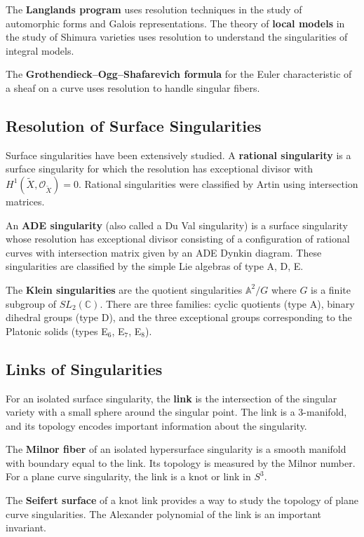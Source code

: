 The \textbf{Langlands program} uses resolution techniques in the study of automorphic forms and Galois representations. The theory of \textbf{local models} in the study of Shimura varieties uses resolution to understand the singularities of integral models.

The \textbf{Grothendieck--Ogg--Shafarevich formula} for the Euler characteristic of a sheaf on a curve uses resolution to handle singular fibers.


\subsection*{Resolution of Surface Singularities}

Surface singularities have been extensively studied. A \textbf{rational singularity} is a surface singularity for which the resolution has exceptional divisor with $H^1(\tilde{X}, \mathcal{O}_{\tilde{X}}) = 0$. Rational singularities were classified by Artin using intersection matrices.

An \textbf{ADE singularity} (also called a Du Val singularity) is a surface singularity whose resolution has exceptional divisor consisting of a configuration of rational curves with intersection matrix given by an ADE Dynkin diagram. These singularities are classified by the simple Lie algebras of type A, D, E.

The \textbf{Klein singularities} are the quotient singularities $\mathbb{A}^2 / G$ where $G$ is a finite subgroup of $SL_2(\mathbb{C})$. There are three families: cyclic quotients (type A), binary dihedral groups (type D), and the three exceptional groups corresponding to the Platonic solids (types E$_6$, E$_7$, E$_8$).

\subsection*{Links of Singularities}

For an isolated surface singularity, the \textbf{link} is the intersection of the singular variety with a small sphere around the singular point. The link is a 3-manifold, and its topology encodes important information about the singularity.

The \textbf{Milnor fiber} of an isolated hypersurface singularity is a smooth manifold with boundary equal to the link. Its topology is measured by the Milnor number. For a plane curve singularity, the link is a knot or link in $S^3$.

The \textbf{Seifert surface} of a knot link provides a way to study the topology of plane curve singularities. The Alexander polynomial of the link is an important invariant.

